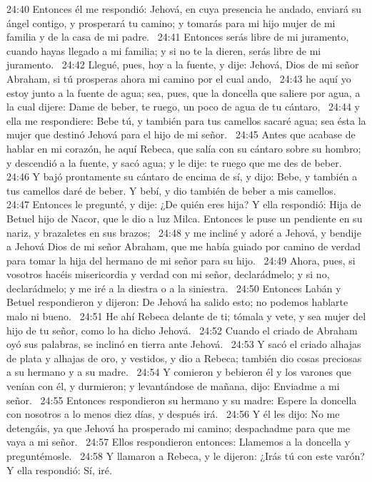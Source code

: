 24:40 Entonces él me respondió: Jehová, en cuya presencia he andado, enviará su ángel contigo, y prosperará tu camino; y tomarás para mi hijo mujer de mi familia y de la casa de mi padre.  
24:41 Entonces serás libre de mi juramento, cuando hayas llegado a mi familia; y si no te la dieren, serás libre de mi juramento.  
24:42 Llegué, pues, hoy a la fuente, y dije: Jehová, Dios de mi señor Abraham, si tú prosperas ahora mi camino por el cual ando,  
24:43 he aquí yo estoy junto a la fuente de agua; sea, pues, que la doncella que saliere por agua, a la cual dijere: Dame de beber, te ruego, un poco de agua de tu cántaro,  
24:44 y ella me respondiere: Bebe tú, y también para tus camellos sacaré agua; sea ésta la mujer que destinó Jehová para el hijo de mi señor.  
24:45 Antes que acabase de hablar en mi corazón, he aquí Rebeca, que salía con su cántaro sobre su hombro; y descendió a la fuente, y sacó agua; y le dije: te ruego que me des de beber.  
24:46 Y bajó prontamente su cántaro de encima de sí, y dijo: Bebe, y también a tus camellos daré de beber. Y bebí, y dio también de beber a mis camellos.  
24:47 Entonces le pregunté, y dije: ¿De quién eres hija? Y ella respondió: Hija de Betuel hijo de Nacor, que le dio a luz Milca. Entonces le puse un pendiente en su nariz, y brazaletes en sus brazos;  
24:48 y me incliné y adoré a Jehová, y bendije a Jehová Dios de mi señor Abraham, que me había guiado por camino de verdad para tomar la hija del hermano de mi señor para su hijo.  
24:49 Ahora, pues, si vosotros hacéis misericordia y verdad con mi señor, declarádmelo; y si no, declarádmelo; y me iré a la diestra o a la siniestra.  
24:50 Entonces Labán y Betuel respondieron y dijeron: De Jehová ha salido esto; no podemos hablarte malo ni bueno.  
24:51 He ahí Rebeca delante de ti; tómala y vete, y sea mujer del hijo de tu señor, como lo ha dicho Jehová.  
24:52 Cuando el criado de Abraham oyó sus palabras, se inclinó en tierra ante Jehová.  
24:53 Y sacó el criado alhajas de plata y alhajas de oro, y vestidos, y dio a Rebeca; también dio cosas preciosas a su hermano y a su madre.  
24:54 Y comieron y bebieron él y los varones que venían con él, y durmieron; y levantándose de mañana, dijo: Enviadme a mi señor.  
24:55 Entonces respondieron su hermano y su madre: Espere la doncella con nosotros a lo menos diez días, y después irá.  
24:56 Y él les dijo: No me detengáis, ya que Jehová ha prosperado mi camino; despachadme para que me vaya a mi señor.  
24:57 Ellos respondieron entonces: Llamemos a la doncella y preguntémosle.  
24:58 Y llamaron a Rebeca, y le dijeron: ¿Irás tú con este varón? Y ella respondió: Sí, iré.  
